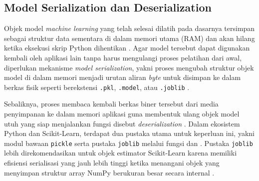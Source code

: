 \documentclass[a4paper,oneside,11pt]{book}
\begin{document}
\subsection{Model Serialization dan Deserialization}
\par Objek model \textit{machine learning} yang telah selesai dilatih pada dasarnya tersimpan sebagai struktur data sementara di dalam memori utama (RAM) dan akan hilang ketika eksekusi skrip Python dihentikan \cite{scikit_persistence}. Agar model tersebut dapat digunakan kembali oleh aplikasi lain tanpa harus mengulangi proses pelatihan dari awal, diperlukan mekanisme \textit{model serialization}, yakni proses mengubah struktur objek model di dalam memori menjadi urutan aliran \textit{byte} untuk disimpan ke dalam berkas fisik seperti berekstensi \texttt{.pkl}, \texttt{.model}, atau \texttt{.joblib} \cite{python_pickle, joblib_docs}.
\par Sebaliknya, proses membaca kembali berkas biner tersebut dari media penyimpanan ke dalam memori aplikasi guna membentuk ulang objek model utuh yang siap menjalankan fungsi  disebut \textit{deserialization} \cite{python_pickle, scikit_persistence}. Dalam ekosistem Python dan Scikit-Learn, terdapat dua pustaka utama untuk keperluan ini, yakni modul bawaan \texttt{pickle} serta pustaka \texttt{joblib} melalui fungsi  dan  \cite{python_pickle, joblib_docs}. Pustaka \texttt{joblib} lebih direkomendasikan untuk objek estimator Scikit-Learn karena memiliki efisiensi serialisasi yang jauh lebih tinggi ketika menangani objek yang menyimpan struktur array NumPy berukuran besar secara internal \cite{scikit_persistence, joblib_docs}.
\end{document}
